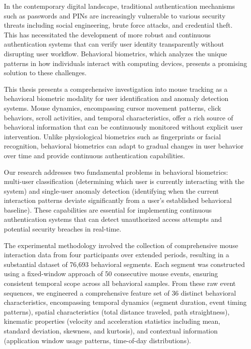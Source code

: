 \documentclass[
  12pt,
  a4paper,
]{report}
\begin{document}
\vspace{2cm}

In the contemporary digital landscape, traditional authentication
mechanisms such as passwords and PINs are increasingly vulnerable to
various security threats including social engineering, brute force
attacks, and credential theft. This has necessitated the development of
more robust and continuous authentication systems that can verify user
identity transparently without disrupting user workflow. Behavioral
biometrics, which analyzes the unique patterns in how individuals
interact with computing devices, presents a promising solution to these
challenges.

This thesis presents a comprehensive investigation into mouse tracking
as a behavioral biometric modality for user identification and anomaly
detection systems. Mouse dynamics, encompassing cursor movement
patterns, click behaviors, scroll activities, and temporal
characteristics, offer a rich source of behavioral information that can
be continuously monitored without explicit user intervention. Unlike
physiological biometrics such as fingerprints or facial recognition,
behavioral biometrics can adapt to gradual changes in user behavior over
time and provide continuous authentication capabilities.

Our research addresses two fundamental problems in behavioral
biometrics: multi-user classification (determining which user is
currently interacting with the system) and single-user anomaly detection
(identifying when the current interaction patterns deviate significantly
from a user's established behavioral baseline). These capabilities are
essential for implementing continuous authentication systems that can
detect unauthorized access attempts and potential security breaches in
real-time.

The experimental methodology involved the collection of comprehensive
mouse interaction data from four participants over extended periods,
resulting in a substantial dataset of 76,693 behavioral segments. Each
segment was constructed using a fixed-window approach of 50 consecutive
mouse events, ensuring consistent temporal scope across all behavioral
samples. From these raw event sequences, we engineered a comprehensive
feature set of 36 distinct behavioral characteristics, encompassing
temporal dynamics (segment duration, event timing patterns), spatial
characteristics (total distance traveled, path straightness), kinematic
properties (velocity and acceleration statistics including mean,
standard deviation, skewness, and kurtosis), and contextual information
(application window usage patterns, time-of-day distributions).
\end{document}
